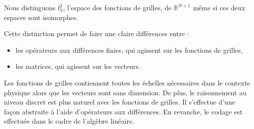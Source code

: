 Nous distinguons $l^2_h$, l'espace des fonctions de grilles, de $\mathbb{R}^{N+1}$ même si ces deux espaces sont isomorphes.

Cette distinction permet de faire une claire différences entre :
\begin{itemize}
\item les opérateurs aux différences finies, qui agissent sur les fonctions de grilles,
\item les matrices, qui agissent sur les vecteurs.
\end{itemize}
Les fonctions de grilles contiennent toutes les échelles nécessaires dans le contexte physique alors que les vecteurs sont sans dimension. De plus, le raisonnement au niveau discret est plus naturel avec les fonctions de grilles. Il s'effectue d'une façon abstraite à l'aide d'opérateurs aux différences. En revanche, le codage est effectuée dans le cadre de l'algèbre linéaire.

